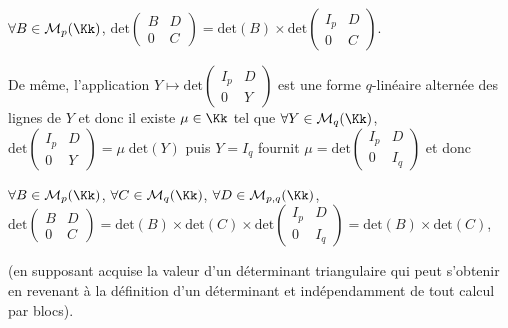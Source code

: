 {{ \begin{center}
 $\forall B\in\mathcal{M}_p(\Kk)$, $\text{det}\left(
 \begin{array}{cc}
 B&D\\
 0&C
 \end{array}
 \right)=\text{det}(B)\times\text{det}\left(
 \begin{array}{cc}
 I_p&D\\
 0&C
 \end{array}
 \right)$.
 \end{center}
 

De même, l'application $Y\mapsto\text{det}\left(
 \begin{array}{cc}
 I_p&D\\
 0&Y
 \end{array}
 \right)$ est une forme $q$-linéaire alternée des lignes de $Y$ et donc il existe $\mu\in\Kk$ tel que $\forall Y\in\mathcal{M}_q(\Kk)$, $\text{det}\left(
 \begin{array}{cc}
 I_p&D\\
 0&Y
 \end{array}
 \right)=\mu\;\text{det}(Y)$ puis $Y=I_q$ fournit $\mu=\text{det}\left(
 \begin{array}{cc}
 I_p&D\\
 0&I_q
 \end{array}
 \right)$ et donc 
 
 \begin{center}
 $\forall B\in\mathcal{M}_p(\Kk)$, $\forall C\in\mathcal{M}_q(\Kk)$, $\forall D\in\mathcal{M}_{p,q}(\Kk)$, $\text{det}\left(
 \begin{array}{cc}
 B&D\\
 0&C
 \end{array}
 \right)=\text{det}(B)\times\text{det}(C)\times\text{det}\left(
 \begin{array}{cc}
 I_p&D\\
 0&I_q
 \end{array}
 \right)=\text{det}(B)\times\text{det}(C)$,
 \end{center}
 

(en supposant acquise la valeur d'un déterminant triangulaire qui peut s'obtenir en revenant à la définition d'un déterminant et indépendamment de tout calcul par blocs).

 \begin{center}
 \end{center}
}
}
